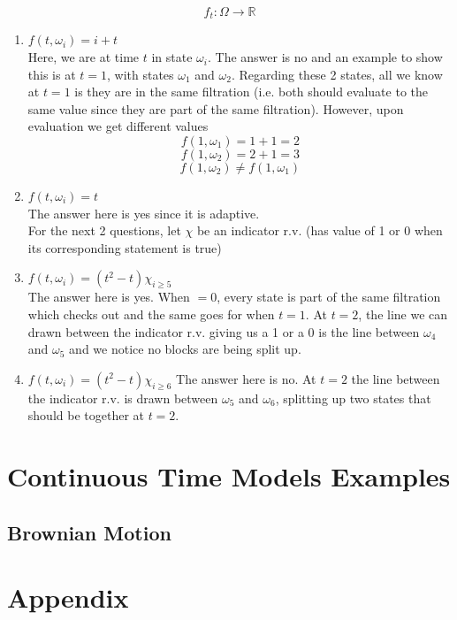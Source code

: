 \documentclass[11pt]{article}
\begin{document}
\[f_t : \Omega \rightarrow \mathbb{R}\]
\begin{enumerate}
    \item $f(t, \omega_i) = i + t$ \\ 
    Here, we are at time $t$ in state $\omega_i$. The answer is no and an example to show this 
    is at $t=1$, with states $\omega_1$ and $\omega_2$. Regarding these 2 states, all we know 
    at $t=1$ is they are in the same filtration (i.e. both should evaluate to the same value 
    since they are part of the same filtration). However, upon evaluation we get different 
    values 
    \[f(1, \omega_1) = 1 + 1 = 2 \]
    \[f(1, \omega_2) = 2 + 1 = 3 \]
    \[f(1, \omega_2) \ne f(1, \omega_1) \]


    \item $f(t, \omega_i) = t$ \\ 
    The answer here is yes since it is adaptive. \\
    
    For the next 2 questions, let $\chi$ be an indicator r.v. (has value of 1 or 0 when its 
    corresponding statement is true)
    \item $f(t, \omega_i) = {(t^2 - t)}{\chi_{i \ge 5}}$ \\ 
    The answer here is yes. When $=0$, every state is part of the same filtration which checks 
    out and the same goes for when $t=1$. At $t=2$, the line we can drawn between the 
    indicator r.v. giving us a 1 or a 0 is the line between $\omega_4$ and $\omega_5$ and we 
    notice no blocks are being split up.

    \item $f(t, \omega_i) = {(t^2 - t)}{\chi_{i \ge 6}}$
    The answer here is no. At $t=2$ the line between the indicator r.v. is drawn between 
    $\omega_5$ and $\omega_6$, splitting up two states that should be together at $t=2$.
\end{enumerate}

\section{Continuous Time Models Examples}

\subsection{Brownian Motion}

\section{Appendix}
\end{document}
